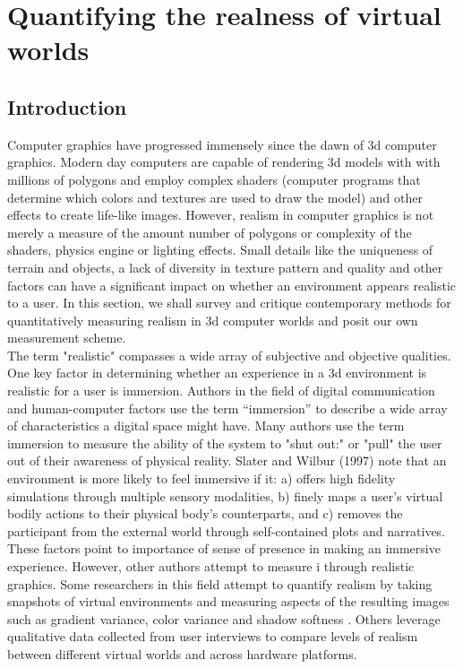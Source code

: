  
\chapter{Quantifying the realness of virtual worlds }\label{text}
\section{Introduction}


Computer graphics have progressed immensely since the dawn of 3d computer graphics. Modern day computers are capable of rendering 3d models with with millions of polygons and employ complex shaders (computer programs that determine which colors and textures are used to draw the model) and other effects to create life-like images. However, realism in computer graphics is not merely a measure of the amount number of polygons or complexity of the shaders, physics engine or lighting effects. Small details like the uniqueness of terrain and objects, a lack of diversity in texture pattern and quality and other factors can have a significant impact on whether an environment appears realistic to a user. In this section, we shall survey and critique contemporary methods for quantitatively measuring realism in 3d computer worlds and posit our own measurement scheme. 
\\

The term "realistic" compasses a wide array of subjective and objective qualities. One key factor in determining whether an experience in a 3d environment is realistic for a user is immersion. Authors in the field of digital communication and human-computer factors use the term “immersion” to describe a wide array of characteristics a digital space might have. Many authors use the term immersion to measure the ability of the system to "shut out:" or "pull" the user out of their awareness of physical reality. 
Slater and Wilbur (1997) note that an environment is more likely to feel immersive if it:
a) offers high fidelity simulations
through multiple sensory modalities, b) finely maps a user’s virtual bodily
actions to their physical body's counterparts, and c) removes the participant
from the external world through self-contained plots and narratives. 
These factors point to importance of sense of presence in making an immersive experience. However, other authors attempt to measure i through realistic graphics. Some researchers in this field attempt to quantify realism by taking snapshots of virtual environments and measuring aspects of the resulting images such as gradient variance, color variance and shadow
softness \cite{Wang:2011:RRP:2013879.2014089}. Others leverage qualitative data collected from user interviews to compare levels of realism between different virtual worlds and across hardware platforms.
\\

